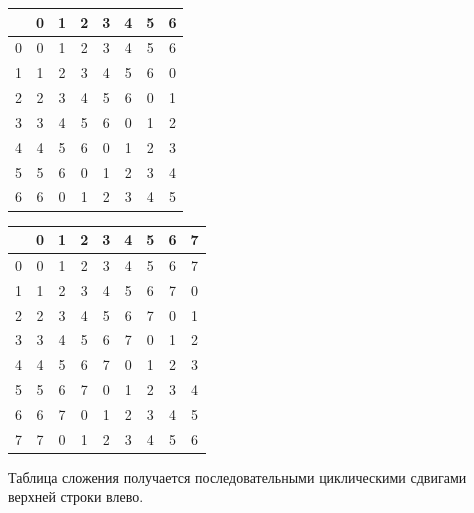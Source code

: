 \begin{enumerate}
\begin{center}
\begin{tabular}{c||c|c|c|c|c|c|c|}
  & 0 & 1 & 2 & 3 & 4 & 5 & 6 \\ \hline\hline
0 & 0 & 1 & 2 & 3 & 4 & 5 & 6 \\ \hline
1 & 1 & 2 & 3 & 4 & 5 & 6 & 0 \\ \hline
2 & 2 & 3 & 4 & 5 & 6 & 0 & 1 \\ \hline
3 & 3 & 4 & 5 & 6 & 0 & 1 & 2 \\ \hline
4 & 4 & 5 & 6 & 0 & 1 & 2 & 3 \\ \hline
5 & 5 & 6 & 0 & 1 & 2 & 3 & 4 \\ \hline
6 & 6 & 0 & 1 & 2 & 3 & 4 & 5 \\ \hline
\end{tabular}
\quad
\begin{tabular}{c||c|c|c|c|c|c|c|c|}
  & 0 & 1 & 2 & 3 & 4 & 5 & 6 & 7 \\ \hline\hline
0 & 0 & 1 & 2 & 3 & 4 & 5 & 6 & 7 \\ \hline
1 & 1 & 2 & 3 & 4 & 5 & 6 & 7 & 0 \\ \hline
2 & 2 & 3 & 4 & 5 & 6 & 7 & 0 & 1 \\ \hline
3 & 3 & 4 & 5 & 6 & 7 & 0 & 1 & 2 \\ \hline
4 & 4 & 5 & 6 & 7 & 0 & 1 & 2 & 3 \\ \hline
5 & 5 & 6 & 7 & 0 & 1 & 2 & 3 & 4 \\ \hline
6 & 6 & 7 & 0 & 1 & 2 & 3 & 4 & 5 \\ \hline
7 & 7 & 0 & 1 & 2 & 3 & 4 & 5 & 6 \\ \hline
\end{tabular}
\end{center}
Таблица сложения получается последовательными циклическими сдвигами верхней строки влево.



\end{enumerate}
